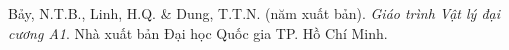 \begin{enumerate}[label={[\arabic*]},leftmargin=0pt,itemindent=*,labelsep=0.4em,
                  align=left,itemsep=6pt]
  \item Bảy, N.T.B., Linh, H.Q. \& Dung, T.T.N. (năm xuất bản). \textit{Giáo trình Vật lý đại cương A1}. Nhà xuất bản Đại học Quốc gia TP. Hồ Chí Minh.
\end{enumerate}
